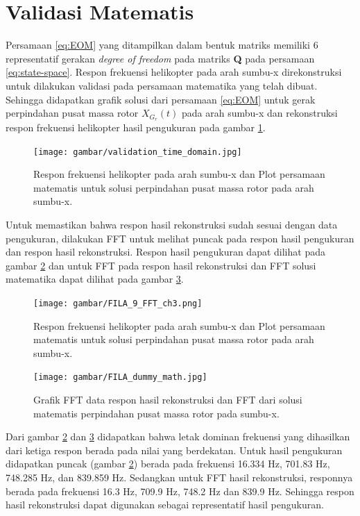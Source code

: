 \section{Validasi Matematis}

Persamaan \ref{eq:EOM} yang ditampilkan dalam bentuk matriks memiliki 6 representatif gerakan \textit{degree of freedom} pada matriks \textbf{Q} pada persamaan \ref{eq:state-space}. Respon frekuensi helikopter pada arah sumbu-x direkonstruksi untuk dilakukan validasi pada persamaan matematika yang telah dibuat. Sehingga didapatkan grafik solusi dari persamaan \ref{eq:EOM} untuk gerak perpindahan pusat massa rotor $X_{G_r}(t)$ pada arah sumbu-x dan rekonstruksi respon frekuensi helikopter hasil pengukuran pada gambar \ref{fig:validation_time_domain}. 

\begin{figure}[H]
	\centering
	\texttt{[image: gambar/validation\_time\_domain.jpg]}
	\caption{Respon frekuensi helikopter pada arah sumbu-x dan Plot persamaan matematis untuk solusi perpindahan pusat massa rotor pada arah sumbu-x.}
	\label{fig:validation_time_domain}
\end{figure}

Untuk memastikan bahwa respon hasil rekonstruksi sudah sesuai dengan data pengukuran, dilakukan FFT untuk melihat puncak pada respon hasil pengukuran dan respon hasil rekonstruksi. Respon hasil pengukuran dapat dilihat pada gambar \ref{fig:FFT_ch3} dan untuk FFT pada respon hasil rekonstruksi dan FFT solusi matematika dapat dilihat pada gambar \ref{fig:FFT_validation}.

\begin{figure}[H]
	\centering
	\texttt{[image: gambar/FILA\_9\_FFT\_ch3.png]}
	\caption{Respon frekuensi helikopter pada arah sumbu-x dan Plot persamaan matematis untuk solusi perpindahan pusat massa rotor pada arah sumbu-x.}
	\label{fig:FFT_ch3}
\end{figure}

\begin{figure}[H]
	\centering
	\texttt{[image: gambar/FILA\_dummy\_math.jpg]}
	\caption{Grafik FFT data respon hasil rekonstruksi dan FFT dari solusi matematis perpindahan pusat massa rotor pada sumbu-x.}
	\label{fig:FFT_validation}
\end{figure}

Dari gambar \ref{fig:FFT_ch3} dan \ref{fig:FFT_validation} didapatkan bahwa letak dominan frekuensi yang dihasilkan dari ketiga respon berada pada nilai yang berdekatan. Untuk hasil pengukuran didapatkan puncak (gambar \ref{fig:FFT_ch3}) berada pada frekuensi 16.334 Hz, 701.83 Hz, 748.285 Hz, dan 839.859 Hz. Sedangkan untuk FFT hasil rekonstruksi, responnya berada pada frekuensi 16.3 Hz, 709.9 Hz, 748.2 Hz dan 839.9 Hz. Sehingga respon hasil rekonstruksi dapat digunakan sebagai representatif hasil pengukuran.

